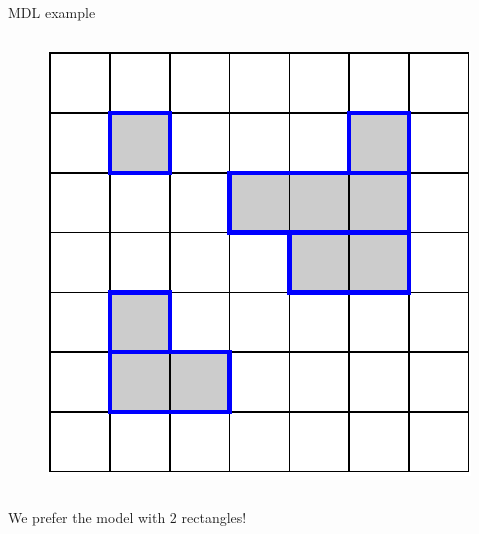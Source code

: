 \documentclass[10pt]{beamer}
\begin{document}
\begin{frame}{MDL example}
\begin{columns}[T, onlytextwidth]
        \begin{figure}
            \centering
            \includegraphics[scale=0.5]{figures/running-example/MDL/example-model-complex.pdf}
        \end{figure}
    \end{columns}

    \centering
    We prefer the model with $2$ rectangles!
\end{frame}
\end{document}

